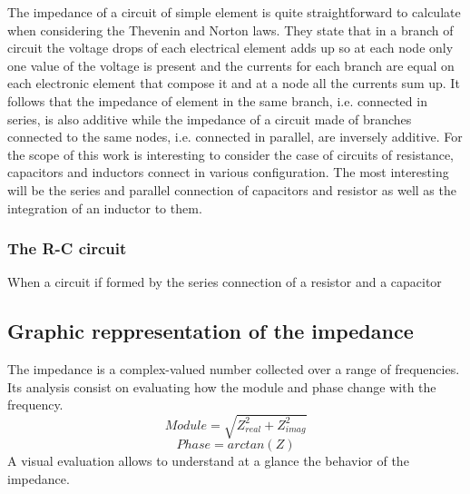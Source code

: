The impedance of a circuit of simple element is quite straightforward to calculate when considering the Thevenin and Norton laws. They state that in a branch of circuit the voltage drops of each electrical element adds up so at each node only one value of the voltage is present and the currents for each branch are equal on each electronic element that compose it and at a node all the currents sum up. It follows that the impedance of element in the same branch, i.e. connected in series, is also additive while the impedance of a circuit made of branches connected to the same nodes, i.e. connected in parallel, are inversely additive. For the scope of this work is interesting to consider the case of circuits of resistance, capacitors and inductors connect in various configuration. The most interesting will be the series and parallel connection of capacitors and resistor as well as the integration of an inductor to them.

\subsubsection{The R-C circuit}

When a circuit if formed by the series connection of a resistor and a capacitor

\subsection{Graphic reppresentation of the impedance}

The impedance is a complex-valued number collected over a range of frequencies. Its analysis consist on evaluating how the module and phase change with the frequency.
$$
Module= \sqrt{Z_{real}^2+Z_{imag}^2}
$$
$$
Phase = arctan(Z)
$$
A visual evaluation allows to understand at a glance the behavior of the impedance.
